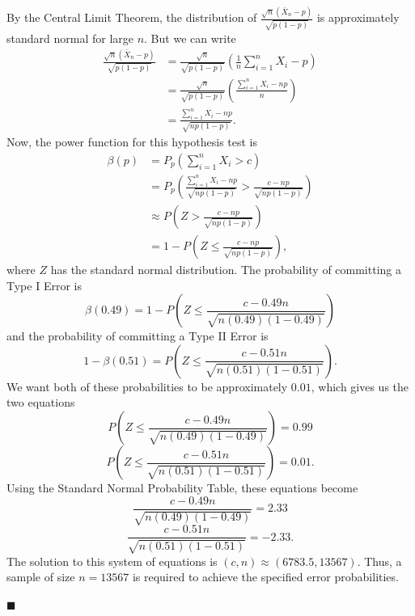 \documentclass[12pt]{article}
\begin{document}
\noindent By the Central Limit Theorem, the distribution of $\frac{\sqrt{n}(\bar{X}_n - p)}{\sqrt{p(1-p)}}$ is approximately standard normal for large $n$.  But we can write
\begin{align}
\frac{\sqrt{n}(\bar{X}_n - p)}{\sqrt{p(1-p)}} &= \frac{\sqrt{n}}{\sqrt{p(1-p)}}\left(\frac{1}{n}\sum\limits_{i=1}^n X_i - p\right) \\
&= \frac{\sqrt{n}}{\sqrt{p(1-p)}}\left(\frac{\sum\limits_{i=1}^n X_i - np}{n}\right) \\
&= \frac{\sum\limits_{i=1}^n X_i - np}{\sqrt{np(1-p)}}.
\end{align}
Now, the power function for this hypothesis test is 
\begin{align}
\beta(p) &= P_p\left(\sum\limits_{i=1}^n X_i > c\right) \\ 
&= P_p\left(\frac{\sum\limits_{i=1}^n X_i - np}{\sqrt{np(1-p)}} > \frac{c - np}{\sqrt{np(1-p)}}\right) \\
&\approx P\left(Z > \frac{c-np}{\sqrt{np(1-p)}} \right) \\
&= 1 - P\left(Z \leq \frac{c-np}{\sqrt{np(1-p)}} \right), 
\end{align}
where $Z$ has the standard normal distribution. The probability of committing a Type I Error is $$\beta(0.49) = 1 - P\left(Z \leq \frac{c-0.49n}{\sqrt{n(0.49)(1-0.49)}} \right)$$ and the probability of committing a Type II Error is $$1 - \beta(0.51) = P\left(Z \leq \frac{c-0.51n}{\sqrt{n(0.51)(1-0.51)}}\right).$$ We want both of these probabilities to be approximately $0.01$, which gives us the two equations
$$P\left(Z \leq \frac{c-0.49n}{\sqrt{n(0.49)(1-0.49)}} \right) = 0.99$$
$$P\left(Z \leq \frac{c-0.51n}{\sqrt{n(0.51)(1-0.51)}}\right) = 0.01.$$
Using the Standard Normal Probability Table, these equations become
$$\frac{c-0.49n}{\sqrt{n(0.49)(1-0.49)}} = 2.33$$
$$\frac{c-0.51n}{\sqrt{n(0.51)(1-0.51)}} = -2.33.$$
The solution to this system of equations is $(c, n) \approx (6783.5, 13567)$.  Thus, a sample of size $n = 13567$ is required to achieve the specified error probabilities.

\hfill$\blacksquare$

\vfill
\begin{center}
\end{center}
\begin{center}
\vspace{-0.6cm}
\hrulefill \\
\vspace{-0.7cm}
\hrulefill
\end{center}
\end{document}
